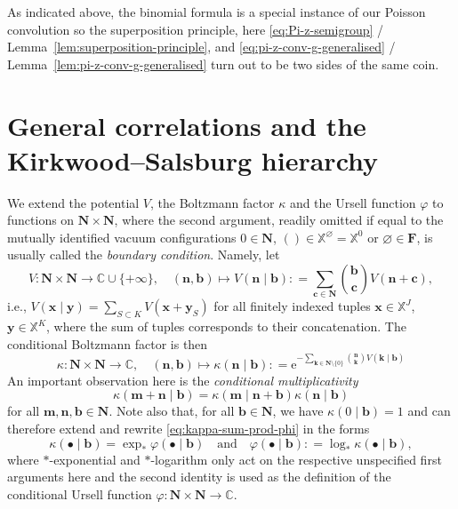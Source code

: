 \documentclass[reqno, 11pt]{amsart}
\theoremstyle{definition}
\newcommand{\e}{\mathrm{e}}
\newcommand{\C}{\mathbb{C}}
\newcommand{\X}{\mathbb X}
\newcommand{\be}{\begin{equation}}
\newcommand{\ee}{\end{equation}}
\begin{document}
As indicated above, the binomial formula is a special instance of our Poisson convolution so the superposition principle, here \eqref{eq:Pi-z-semigroup} / Lemma~\ref{lem:superposition-principle}, and \eqref{eq:pi-z-conv-g-generalised} / Lemma~\ref{lem:pi-z-conv-g-generalised} turn out to be two sides of the same coin.

\section{General correlations and the Kirkwood--Salsburg hierarchy} \label{sec:prelims-conditional-root-KS}

We extend the potential $V$, the Boltzmann factor $\kappa$ and the Ursell function $\varphi$ to functions on $\mathbf N \times \mathbf N$, where the second argument, readily omitted if equal to the mutually identified vacuum configurations $0 \in \mathbf N$, $() \in \X^\varnothing = \X^0$ or $\varnothing \in \mathbf F$, is usually called the \emph{boundary condition}. 
Namely, let
\[
	V : \mathbf N \times \mathbf N \to \C \cup \{+\infty\}, \quad (\mathbf n, \mathbf b) \mapsto V(\mathbf n \mid \mathbf b) : =  \sum_{\mathbf c \in \mathbf N} \binom{\mathbf b}{\mathbf c} V(\mathbf n + \mathbf c),
\]
i.e., $V(\mathbf x \mid \mathbf y) = \sum_{S \subset K} V(\mathbf x + \mathbf y_S)$ for all finitely indexed tuples $\mathbf x \in \X^J$, $\mathbf y \in \X^K$, where the sum of tuples corresponds to their concatenation. The conditional Boltzmann factor is then
\[
	\kappa : \mathbf N \times \mathbf N \to \C, \quad (\mathbf n, \mathbf b) \mapsto \kappa(\mathbf n \mid \mathbf b) : = \e^{- \sum_{\mathbf k \in \mathbf N \setminus \{0\}} \binom{\mathbf n}{\mathbf k} V(\mathbf k \mid \mathbf b)}
\]
An important observation here is the \emph{conditional multiplicativity}
\be \label{eq:D-kappa}
	\kappa(\mathbf m + \mathbf n \mid \mathbf b) = \kappa(\mathbf m \mid \mathbf n + \mathbf b) \kappa(\mathbf n \mid \mathbf b)
\ee
for all $\mathbf m, \mathbf n, \mathbf b \in \mathbf N$. 
Note also that, for all $\mathbf b \in \mathbf N$, we have $\kappa(0 \mid \mathbf b) = 1$ and can therefore extend and rewrite \eqref{eq:kappa-sum-prod-phi} in the forms
\be \label{eq:kappa-exp-phi-phi-log-kappa}
	\kappa(\bullet \mid \mathbf b) = \exp_\ast \varphi(\bullet \mid \mathbf b) \quad \text{and} \quad \varphi(\bullet \mid \mathbf b) : = \log_\ast \kappa(\bullet \mid \mathbf b),
\ee
where $\ast$-exponential and $\ast$-logarithm only act on the respective unspecified first arguments here and the second identity is used as the definition of the conditional Ursell function $\varphi : \mathbf N \times \mathbf N \to \C$.
\end{document}
